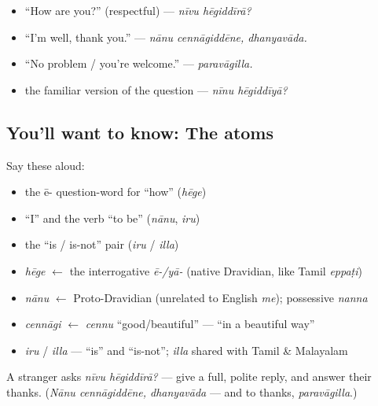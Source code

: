 \begin{itemize}
\raggedright
  \item \textquotedblleft{}How are you?\textquotedblright{} (respectful) — \emph{nīvu hēgiddīrā?}
  \item \textquotedblleft{}I'm well, thank you.\textquotedblright{} — \emph{nānu cennāgiddēne, dhanyavāda.}
  \item \textquotedblleft{}No problem / you're welcome.\textquotedblright{} — \emph{paravāgilla.}
  \item the familiar version of the question — \emph{nīnu hēgiddīyā?}
\end{itemize}

\subsection*{You'll want to know: The atoms}
Say these aloud:

\begin{itemize}
\raggedright
  \item the ē- question-word for \textquotedblleft{}how\textquotedblright{} (\emph{hēge})
  \item \textquotedblleft{}I\textquotedblright{} and the verb \textquotedblleft{}to be\textquotedblright{} (\emph{nānu}, \emph{iru})
  \item the \textquotedblleft{}is / is-not\textquotedblright{} pair (\emph{iru} / \emph{illa})
\end{itemize}

\begin{cousinweb}
\begin{itemize}
\raggedright
  \item \emph{hēge} $\leftarrow$ the interrogative \emph{ē-/yā-} (native Dravidian, like Tamil \emph{eppaṭi})
  \item \emph{nānu} $\leftarrow$ Proto-Dravidian (unrelated to English \emph{me}); possessive \emph{nanna}
  \item \emph{cennāgi} $\leftarrow$ \emph{cennu} \textquotedblleft{}good/beautiful\textquotedblright{} — \textquotedblleft{}in a beautiful way\textquotedblright{}
  \item \emph{iru} / \emph{illa} — \textquotedblleft{}is\textquotedblright{} and \textquotedblleft{}is-not\textquotedblright{}; \emph{illa} shared with Tamil \& Malayalam
\end{itemize}
\end{cousinweb}

\begin{tcolorbox}[breakable,colback=teal!4,colframe=teal!35!black,title={Before you move on}]
A stranger asks \emph{nīvu hēgiddīrā?} — give a full, polite reply, and answer their thanks. (\emph{Nānu cennāgiddēne, dhanyavāda} — and to thanks, \emph{paravāgilla}.)
\end{tcolorbox}
